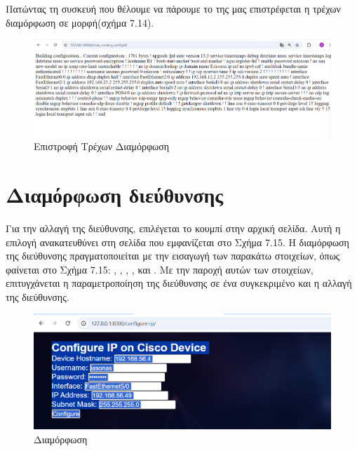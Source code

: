 \FloatBarrier


\noindent Πατώντας τη συσκευή που θέλουμε να πάρουμε το  της μας επιστρέφεται η τρέχων διαμόρφωση σε  μορφή(σχήμα 7.14).



\FloatBarrier

\begin{figure}[h]
	\centering
	\includegraphics[width=1.0\textwidth]{graphics/running_config.png}
	\caption{Επιστροφή Τρέχων Διαμόρφωση}
\end{figure}

\FloatBarrier


\section{Διαμόρφωση διεύθυνσης }

Για την αλλαγή της  διεύθυνσης, επιλέγεται το κουμπί  στην αρχική σελίδα. Αυτή η επιλογή ανακατευθύνει στη σελίδα  που εμφανίζεται στο Σχήμα 7.15. Η διαμόρφωση της  διεύθυνσης πραγματοποιείται με την εισαγωγή των παρακάτω στοιχείων, όπως φαίνεται στο Σχήμα 7.15: , , , ,  και . Με την παροχή αυτών των στοιχείων, επιτυγχάνεται η παραμετροποίηση της  διεύθυνσης σε ένα συγκεκριμένο  και η αλλαγή της διεύθυνσης.

\FloatBarrier

\begin{figure}[h]
	\centering
	\includegraphics[width=1.0\textwidth]{graphics/configure_ip.png}
	\caption{ Διαμόρφωση}
\end{figure}

